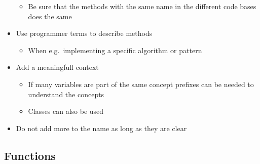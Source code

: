 \documentclass[11pt]{article}
\providecommand{\tightlist}{%
      \setlength{\itemsep}{0pt}\setlength{\parskip}{0pt}}
\begin{document}
\begin{itemize}
  \begin{itemize}
  \tightlist
  \item
    Be sure that the methods with the same name in the different code
    bases does the same
  \end{itemize}
\item
  Use programmer terms to describe methods

  \begin{itemize}
  \tightlist
  \item
    When e.g.~implementing a specific algorithm or pattern
  \end{itemize}
\item
  Add a meaningfull context

  \begin{itemize}
  \tightlist
  \item
    If many variables are part of the same concept prefixes can be
    needed to understand the concepts\\
  \item
    Classes can also be used
  \end{itemize}
\item
  Do not add more to the name as long as they are clear
\end{itemize}

\hypertarget{functions}{%
\subsection{Functions}\label{functions}}
\end{document}
